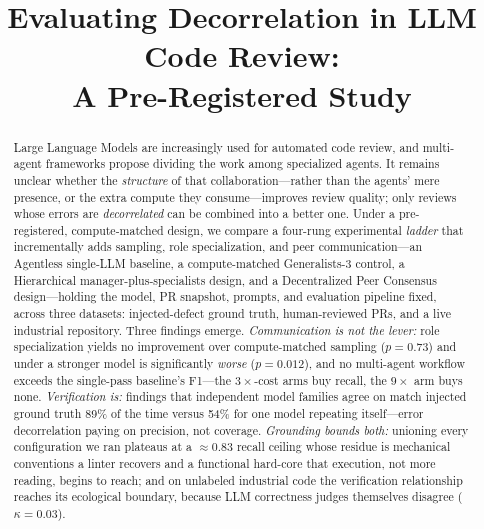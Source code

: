 \documentclass[conference]{IEEEtran}
\begin{document}
\title{Evaluating Decorrelation in LLM Code Review:\\
A Pre-Registered Study}

\author{
}

\maketitle

\begin{abstract}
Large Language Models are increasingly used for automated code review, and
multi-agent frameworks propose dividing the work among specialized agents. It
remains unclear whether the \emph{structure} of that collaboration---rather than
the agents' mere presence, or the extra compute they consume---improves review
quality; only reviews whose errors are \emph{decorrelated} can be combined into a
better one. Under a pre-registered, compute-matched design, we compare a
four-rung experimental \emph{ladder} that incrementally adds sampling, role
specialization, and peer communication---an Agentless single-LLM baseline, a
compute-matched Generalists-3 control, a Hierarchical manager-plus-specialists
design, and a Decentralized Peer Consensus design---holding the model, PR
snapshot, prompts, and evaluation pipeline fixed, across three datasets:
injected-defect ground truth, human-reviewed PRs, and a live industrial
repository. Three findings emerge. \emph{Communication is not the lever:} role
specialization yields no improvement over compute-matched sampling ($p{=}0.73$)
and under a stronger model is significantly \emph{worse} ($p{=}0.012$), and no
multi-agent workflow exceeds the single-pass baseline's F1---the $3\times$-cost
arms buy recall, the $9\times$ arm buys none. \emph{Verification is:} findings that
independent model families agree on match injected ground truth 89\% of the time
versus 54\% for one model repeating itself---error decorrelation paying on
precision, not coverage. \emph{Grounding bounds both:} unioning every
configuration we ran plateaus at a ${\approx}0.83$ recall ceiling whose residue
is mechanical conventions a linter recovers and a functional hard-core that
execution, not more reading, begins to reach; and on unlabeled industrial code
the verification relationship reaches its ecological boundary, because LLM
correctness judges themselves disagree ($\kappa{=}0.03$).
\end{abstract}
\end{document}
